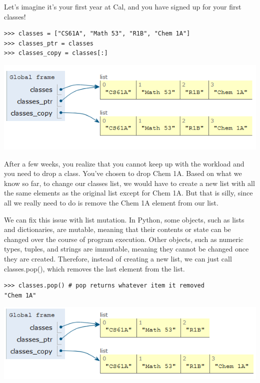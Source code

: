 Let’s imagine it’s your first year at Cal, and you have signed up for your first classes!
\begin{lstlisting}
>>> classes = ["CS61A", "Math 53", "R1B", "Chem 1A"]
>>> classes_ptr = classes
>>> classes_copy = classes[:]
\end{lstlisting}

\begin{center}
\includegraphics[scale=0.75]{pointers.PNG}
\end{center}
After a few weeks, you realize that you cannot keep up with the workload and you need to drop a class. You’ve chosen to drop Chem 1A. Based on what we know so far, to change our classes list, we would have to create a new list with all the same elements as the original list except for Chem 1A. But that is silly, since all we really need to do is remove the Chem 1A element from our list.

We can fix this issue with list mutation. In Python, some objects, such as lists and dictionaries, are mutable, meaning that their contents or state can be changed over the course of program execution. Other objects, such as numeric types, tuples, and strings are immutable, meaning they cannot be changed once they are created. Therefore, instead of creating a new list, we can just call classes.pop(), which removes the last element from the list.
\newpage
\begin{lstlisting}
>>> classes.pop() # pop returns whatever item it removed
"Chem 1A"
\end{lstlisting}

\begin{center}
\includegraphics[scale=0.75]{pointers_mutate.PNG}
\end{center}

